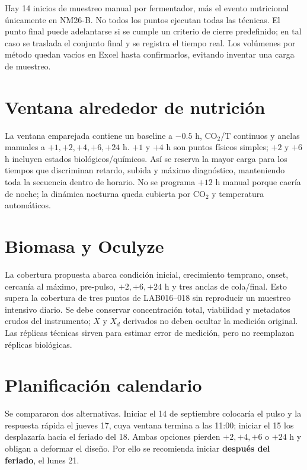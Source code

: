 \documentclass[11pt,a4paper]{article}
\begin{document}
Hay 14 inicios de muestreo manual por fermentador, más el evento nutricional
únicamente en NM26-B. No todos los puntos ejecutan todas las técnicas. El punto
final puede adelantarse si se cumple un criterio de cierre predefinido; en tal
caso se traslada el conjunto final y se registra el tiempo real. Los volúmenes
por método quedan vacíos en Excel hasta confirmarlos, evitando inventar una carga
de muestreo.

\section{Ventana alrededor de nutrición}

La ventana emparejada contiene un baseline a \(-0.5\) h, CO$_2$/T continuos y
anclas manuales a \(+1,+2,+4,+6,+24\) h. \(+1\) y \(+4\) h son puntos físicos
simples; \(+2\) y \(+6\) h incluyen estados biológicos/químicos. Así se reserva
la mayor carga para los tiempos que discriminan retardo, subida y máximo
diagnóstico, manteniendo toda la secuencia dentro de horario. No se programa
\(+12\) h manual porque caería de noche; la dinámica nocturna queda cubierta por
CO$_2$ y temperatura automáticos.

\section{Biomasa y Oculyze}

La cobertura propuesta abarca condición inicial, crecimiento temprano, onset,
cercanía al máximo, pre-pulso, \(+2,+6,+24\) h y tres anclas de cola/final. Esto
supera la cobertura de tres puntos de LAB016--018 sin reproducir un muestreo
intensivo diario. Se debe conservar concentración total, viabilidad y metadatos
crudos del instrumento; \(X\) y \(X_d\) derivados no deben ocultar la medición
original. Las réplicas técnicas sirven para estimar error de medición, pero no
reemplazan réplicas biológicas.

\section{Planificación calendario}

Se compararon dos alternativas. Iniciar el 14 de septiembre colocaría el pulso y
la respuesta rápida el jueves 17, cuya ventana termina a las 11:00; iniciar el 15
los desplazaría hacia el feriado del 18. Ambas opciones pierden \(+2,+4,+6\) o
\(+24\) h y obligan a deformar el diseño. Por ello se recomienda iniciar
\textbf{después del feriado}, el lunes 21.
\end{document}
